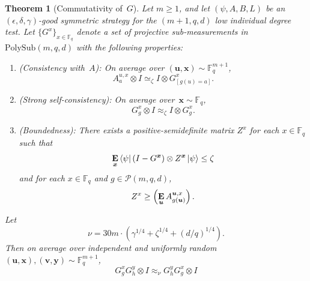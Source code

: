 \documentclass[11pt]{article}
\newtheorem{theorem}{Theorem}[section]
\theoremstyle{definition}
\newcommand{\E}{\mathop{\bf E\/}}
\newcommand{\F}{\mathbb F}
\newcommand{\eps}{\epsilon}
\newcommand{\ot}{\otimes}
\newcommand{\calP}{\mathcal{P}}
\newcommand{\bu}{\boldsymbol{u}}
\newcommand{\bv}{\boldsymbol{v}}
\newcommand{\bx}{{\boldsymbol{x}}}
\newcommand{\by}{\boldsymbol{y}}
\newcommand{\polyfunc}[3]{\calP(#1, #2, #3)}
\newcommand{\polysub}[3]{\mathrm{PolySub}(#1, #2, #3)}
\begin{document}
\begin{theorem}[Commutativity of~$G$]\label{thm:com-main}
  Let $m\geq1$, and let $(\psi, A, B, L)$ be an $(\eps, \delta, \gamma)$-good symmetric strategy for the $(m+1,q,d)$ low individual degree test.
  Let $\{G^x\}_{x \in \F_q}$ denote a set of projective sub-measurements in $\polysub{m}{q}{d}$ with the following properties:
  \begin{enumerate}
  \item (Consistency with~$A$): \label{item:commuting-consistency} On average over $(\bu, \bx) \sim \F_q^{m+1}$,
	  \begin{equation*}
	  A^{u, x}_a \otimes I \simeq_{\zeta} I \otimes G^x_{[g(u)=a]}.
	  \end{equation*}
  \item (Strong self-consistency): \label{item:commuting-self-consistency} On average over~$\bx \sim \F_q$,
	\begin{equation*}
		G^x_g \otimes I \approx_{\zeta} I \otimes G^x_g.
	\end{equation*}
  \item (Boundedness): \label{item:commuting-boundedness} There exists a positive-semidefinite matrix $Z^x$ for each $x \in \F_q$ such that
	\begin{equation*}
		\E_{\bx} \bra{\psi} (I-G^{\bx})\otimes Z^{\bx} \ket{\psi} \leq \zeta
	\end{equation*}
	and for each $x \in \F_q$ and $g \in \polyfunc{m}{q}{d}$,
	\begin{equation*}
	Z^x \geq \left(\E_{\bu} A^{\bu, x}_{g(\bu)}\right).
	\end{equation*}
  \end{enumerate}
  Let
  \begin{equation*}
  \nu = 30m \cdot \left(\gamma^{1/4}+ \zeta^{1/4} + (d/q)^{1/4}  \right).
  \end{equation*}
  Then on average over independent and uniformly random $(\bu,\bx), (\bv,\by) \sim \F_q^{m+1}$,
  \begin{equation*}
    G^{x}_{g} G^{y}_h \ot I \approx_{\nu} G^y_h G^x_g \ot I
  \end{equation*}
\end{theorem}
\end{document}
